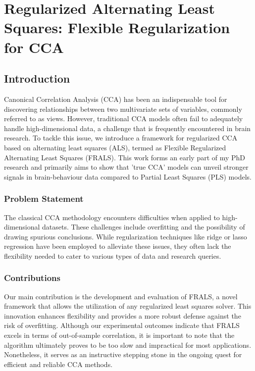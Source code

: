 \chapter{Regularized Alternating Least Squares: Flexible Regularization for CCA}
\label{chap:als}
\minitoc

\section{Introduction}\label{sec:introduction}

Canonical Correlation Analysis (CCA) has been an indispensable tool for discovering relationships between two multivariate sets of variables, commonly referred to as views. However, traditional CCA models often fail to adequately handle high-dimensional data, a challenge that is frequently encountered in brain research. To tackle this issue, we introduce a framework for regularized CCA based on alternating least squares (ALS), termed as Flexible Regularized Alternating Least Squares (FRALS). This work forms an early part of my PhD research and primarily aims to show that 'true CCA' models can unveil stronger signals in brain-behaviour data compared to Partial Least Squares (PLS) models.

\subsection{Problem Statement}\label{subsec:problem-statement}
The classical CCA methodology encounters difficulties when applied to high-dimensional datasets. These challenges include overfitting and the possibility of drawing spurious conclusions. While regularization techniques like ridge or lasso regression have been employed to alleviate these issues, they often lack the flexibility needed to cater to various types of data and research queries.

\subsection{Contributions}\label{subsec:contributions}
Our main contribution is the development and evaluation of FRALS, a novel framework that allows the utilization of any regularized least squares solver. This innovation enhances flexibility and provides a more robust defense against the risk of overfitting. Although our experimental outcomes indicate that FRALS excels in terms of out-of-sample correlation, it is important to note that the algorithm ultimately proves to be too slow and impractical for most applications. Nonetheless, it serves as an instructive stepping stone in the ongoing quest for efficient and reliable CCA methods.

